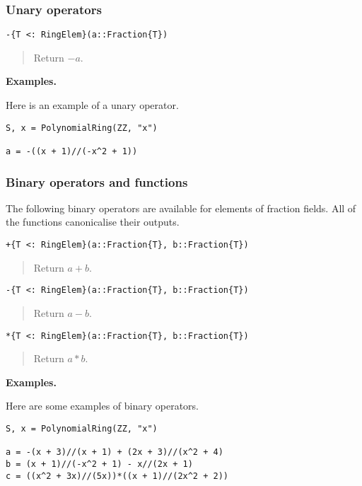 \documentclass[a4paper,10pt]{article}
\newcommand{\desc}[1]{\vspace{-3mm}\begin{quote}#1\end{quote}}
\begin{document}
\subsubsection{Unary operators}

\begin{lstlisting}
-{T <: RingElem}(a::Fraction{T})
\end{lstlisting}

\desc{Return $-a$.}

\textbf{Examples.}

Here is an example of a unary operator.

\begin{lstlisting}
S, x = PolynomialRing(ZZ, "x")

a = -((x + 1)//(-x^2 + 1))
\end{lstlisting}

\subsubsection{Binary operators and functions}

The following binary operators are available for elements of fraction fields.
All of the functions canonicalise their outputs.

\begin{lstlisting}
+{T <: RingElem}(a::Fraction{T}, b::Fraction{T})
\end{lstlisting}

\desc{Return $a + b$.}

\begin{lstlisting}
-{T <: RingElem}(a::Fraction{T}, b::Fraction{T})
\end{lstlisting}

\desc{Return $a - b$.}

\begin{lstlisting}
*{T <: RingElem}(a::Fraction{T}, b::Fraction{T})
\end{lstlisting}

\desc{Return $a*b$.}

\textbf{Examples.}

Here are some examples of binary operators.

\begin{lstlisting}
S, x = PolynomialRing(ZZ, "x")

a = -(x + 3)//(x + 1) + (2x + 3)//(x^2 + 4)
b = (x + 1)//(-x^2 + 1) - x//(2x + 1)
c = ((x^2 + 3x)//(5x))*((x + 1)//(2x^2 + 2))
\end{lstlisting}
\end{document}
